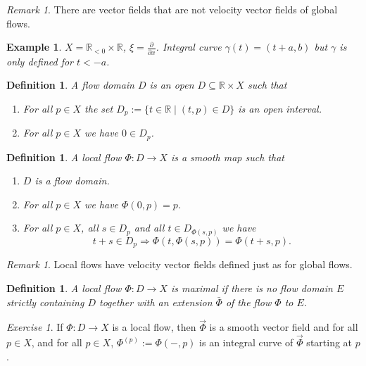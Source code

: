\documentclass[12pt]{article}
\theoremstyle{darkgreentheorem}
\theoremstyle{darkbluedefinition}
\newtheorem{defn}[thm]{Definition}
\theoremstyle{darkredexample}
\newtheorem{exa}[thm]{Example}
\theoremstyle{remark}
\newtheorem{rem}[thm]{Remark}
\newtheorem{exe}[thm]{Exercise}
\newcommand{\R}{\mathbb{R}}
\newcommand{\1}{\mathbbm{1}}
\newcommand{\db}{\marginnote{\dbend}}
\newcommand{\tms}{\times}
\newcommand{\sub}{\subseteq}
\begin{document}
\begin{rem}
    \db There are vector fields that are not velocity vector fields of global flows.
\end{rem}

\begin{exa}
    $X=\R_{<0}\tms \R$, $\xi=\frac{\partial }{\partial x}$.
    Integral curve $\gamma(t)=(t+a,b)$ but $\gamma$ is only defined for $t<-a$.
\end{exa}

\begin{defn}
    A \textit{flow domain} $D$ is an open $D\sub \R\tms X$ such that
    \begin{enumerate}
	\item For all $p\in X$ the set $D_{p}:=\{t\in \R\mid (t,p)\in D\}$ is an open interval.
	\item For all $p\in X$ we have $0\in D_{p}$.
    \end{enumerate}
\end{defn}

\begin{defn}
    A \textit{local flow} $\Phi\colon D\to X$ is a smooth map such that
    \begin{enumerate}
	\item $D$ is a flow domain.
	\item For all $p\in X$ we have $\Phi(0,p)=p$.
	\item For all $p\in X$, all $s\in D_{p}$ and all $t\in D_{\Phi(s,p)}$ we have
	    \[ t+s\in D_{p}\Rightarrow \Phi(t,\Phi(s,p))=\Phi(t+s,p).\]
    \end{enumerate}
\end{defn}

\begin{rem}
    Local flows have velocity vector fields defined just as for global flows.
\end{rem}

\begin{defn}
    A local flow $\Phi\colon D\to X$ is \textit{maximal} if there is no flow domain $E$ strictly containing $D$ together with an extension $\bar{\Phi}$ of the flow $\Phi$ to $E$.
\end{defn}

\begin{exe}
    If $\Phi\colon D\to X$ is a local flow, then $\vec{\Phi}$ is a smooth vector field and for all $p\in X$, and for all $p\in X$, $\Phi^{(p)}:=\Phi(-,p)$ is an integral curve of $\vec{\Phi}$ starting at $p$.
\end{exe}
\end{document}
